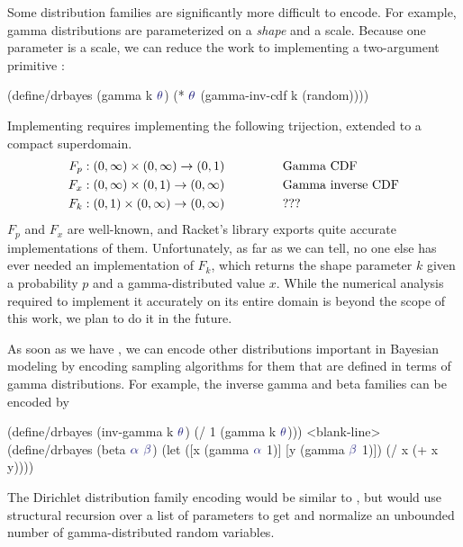Some distribution families are significantly more difficult to encode.
For example, gamma distributions are parameterized on a \emph{shape} and a scale.
Because one parameter is a scale, we can reduce the work to implementing a two-argument primitive :
\begin{center}\singlespacing
\begin{schemedisplay}
(define/drbayes (gamma k $\va{\theta}$)
  (* $\va{\theta}$ (gamma-inv-cdf k (random))))
\end{schemedisplay}
\end{center}
Implementing  requires implementing the following trijection, extended to a compact superdomain.
\begin{equation}
\begin{aligned}
	F_p &: (0,{\infty}) \times (0,{\infty}) \to (0,1) \hspace{0.5in}&& \text{Gamma CDF} \\
	F_x &: (0,{\infty}) \times (0,1) \to (0,{\infty}) && \text{Gamma inverse CDF} \\
	F_k &: (0,1) \times (0,\infty) \to (0,{\infty}) && \text{???}
\end{aligned}
\end{equation}
$F_p$ and $F_x$ are well-known, and Racket's  library exports quite accurate implementations of them.
Unfortunately, as far as we can tell, no one else has ever needed an implementation of $F_k$, which returns the shape parameter $k$ given a probability $p$ and a gamma-distributed value $x$.
While the numerical analysis required to implement it accurately on its entire domain is beyond the scope of this work, we plan to do it in the future.

As soon as we have , we can encode other distributions important in Bayesian modeling by encoding sampling algorithms for them that are defined in terms of gamma distributions.
For example, the inverse gamma and beta families can be encoded by
\begin{center}\singlespacing
\begin{schemedisplay}
(define/drbayes (inv-gamma k $\va{\theta}$)
  (/ 1 (gamma k $\va{\theta}$)))
<blank-line>
(define/drbayes (beta $\va{\alpha}$ $\va{\beta}$)
  (let ([x  (gamma $\va{\alpha}$ 1)]
        [y  (gamma $\va{\beta}$ 1)])
    (/ x (+ x y))))
\end{schemedisplay}
\end{center}
The Dirichlet distribution family encoding would be similar to , but would use structural recursion  over a list of parameters to get and normalize an unbounded number of gamma-distributed random variables.

